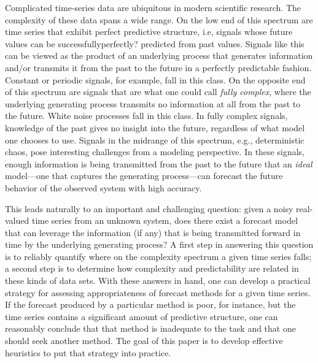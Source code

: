 %
Complicated time-series data are ubiquitous in modern scientific
research.  The complexity of these data spans a wide range.  On the
low end of this spectrum are time series that exhibit perfect
predictive structure, i.e, signals whose future values can be
successfully\alert{perfectly?} predicted from past values.  Signals like this can be
viewed as the product of an underlying process that generates
information and/or transmits it from the past to the future in a
perfectly predictable fashion.  Constant or periodic signals, for
example, fall in this class.  On the opposite end of this spectrum are
signals that are what one could call \emph{fully complex}, where the
underlying generating process transmits no information at all from the
past to the future.  White noise processes fall in this class.  In
fully complex signals, knowledge of the past gives no insight into the
future, regardless of what model one chooses to use. Signals in the
midrange of this spectrum, e.g., deterministic chaos, pose interesting
challenges from a modeling perspective.  In these signals, enough
information is being transmitted from the past to the future that an
\emph{ideal} model---one that captures the generating process---can
forecast the future behavior of the observed system with high
accuracy.


This leads naturally to an important and challenging question: given a
noisy real-valued time series from an unknown system, does there exist
a forecast model that can leverage the information (if any) that is
being transmitted forward in time by the underlying generating
process?  A first step in answering this question is to reliably
quantify where on the complexity spectrum a given time series falls; a
second step is to determine how complexity and predictability are
related in these kinds of data sets.  With these answers in hand, one
can develop a practical strategy for assessing appropriateness of
forecast methods for a given time series.  If the forecast produced by
a particular method is poor, for instance, but the time series
contains a significant amount of predictive structure, one can
reasonably conclude that that method is inadequate to the task and
that one should seek another method.  The goal of this paper is to
develop effective heuristics to put that strategy into practice.

